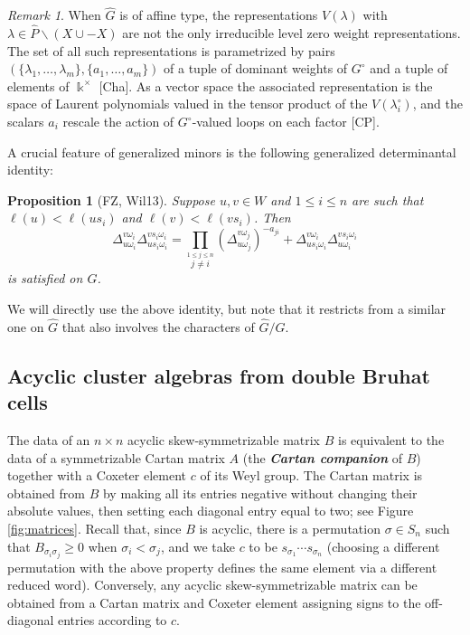 \documentclass[12pt]{amsart}
\newcommand{\newword}[1]{\textbf{\emph{#1}}}
\newcommand{\kk}{\Bbbk}%
\newtheorem{proposition}[theorem]{Proposition}
\theoremstyle{remark}
\newtheorem{remark}[theorem]{Remark}
\numberwithin{equation}{section}
\begin{document}
\begin{remark}
When $\widehat{G}$ is of affine type, the representations $V(\lambda)$ with $\lambda \in \widehat{P}\smallsetminus(X \cup - X)$ are not the only irreducible level zero weight representations. The set of all such representations is parametrized by pairs $(\{\lambda_1,\dotsc,\lambda_m\},\{a_1,\dotsc,a_m\})$ of a tuple of dominant weights of $G^\circ$ and a tuple of elements of $\kk^\times$ [Cha]. As a vector space the associated representation is the space of Laurent polynomials valued in the tensor product of the $V(\lambda_i^\circ)$, and the scalars $a_i$ rescale the action of $G^\circ$-valued loops on each factor [CP].
\end{remark}

A crucial feature of generalized minors is the following generalized determinantal identity:

\begin{proposition}[FZ, Wil13]
  \label{prop:fundid}
  Suppose $u,v \in W$ and $1 \leq i \leq n$ are such that $\ell(u)<\ell(us_i)$ and $\ell(v)<\ell(vs_i)$. 
  Then 
  \begin{equation}
    \label{eq:fundid}
    \Delta_{u\omega_i}^{v\omega_i} \Delta_{us_i\omega_i}^{vs_i\omega_i} 
    =
    \prod_{\stackrel{1\leq j \leq n}{j\neq i}}\left(\Delta_{u\omega_j}^{v\omega_j}\right)^{-a_{ji}}
    +
    \Delta_{us_i\omega_i}^{v\omega_i} \Delta_{u\omega_i}^{vs_i\omega_i}
  \end{equation}
is satisfied on $G$.
\end{proposition}

We will directly use the above identity, but note that it restricts from a similar one on $\widehat{G}$ that also involves the characters of $\widehat{G}/G$.

\subsection{Acyclic cluster algebras from double Bruhat cells}

The data of an $n\times n$ acyclic skew-symmetrizable matrix $B$ is equivalent to the data of a symmetrizable Cartan matrix $A$ (the \newword{Cartan companion} of $B$) together with a Coxeter element $c$ of its Weyl group.
The Cartan matrix is obtained from $B$ by making all its entries negative without changing their absolute values, then setting each diagonal entry equal to two; see Figure \ref{fig:matrices}.
Recall that, since $B$ is acyclic, there is a permutation $\sigma \in S_n$ such that $B_{\sigma_i \sigma_j} \geq 0$ when $\sigma_i < \sigma_j$, and we take $c$ to be $s_{\sigma_1} \cdots s_{\sigma_n}$ (choosing a different permutation with the above property defines the same element via a different reduced word).
Conversely, any acyclic skew-symmetrizable matrix can be obtained from a Cartan matrix and Coxeter element assigning signs to the off-diagonal entries according to $c$.
\end{document}
